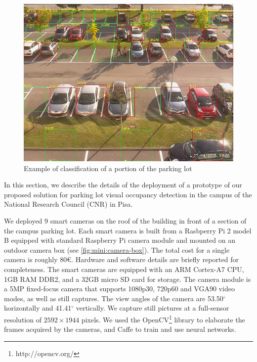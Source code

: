 \begin{figure}
	\centering
		\includegraphics[width=\columnwidth,trim={0 0 0 3.5ex},clip]{detection-example}
        \caption{Example of classification of a portion of the parking lot}
	\label{fig:mini:detection-example}
\end{figure}

In this section, we describe the details of the deployment of a prototype of our proposed solution for parking lot visual occupancy detection in the campus of the National Research Council (CNR) in Pisa.

We deployed 9 smart cameras on the roof of the building in front of a section of the campus parking lot.
Each smart camera is built from a Rasbperry Pi 2 model B equipped with standard Raspberry Pi camera module and mounted on an outdoor camera box (see \ref{fig:mini:camera-box}).
The total cost for a single camera is roughly 80\euro.
Hardware and software details are briefly reported for completeness.
The smart cameras are equipped with an ARM Cortex-A7 CPU, 1GB RAM DDR2, and a 32GB micro SD card for storage.
The camera module is a 5MP fixed-focus camera that supports 1080p30, 720p60 and VGA90 video modes, as well as still captures.
The view angles of the camera are 53.50$^{\circ}$ horizontally and 41.41$^{\circ}$ vertically.
We capture still pictures at a full-sensor resolution of $2592 \times 1944$ pixels.
We used the OpenCV\footnote{http://opencv.org/} library to elaborate the frames acquired by the cameras, and Caffe \cite{jia2014caffe} to train and use neural networks.

